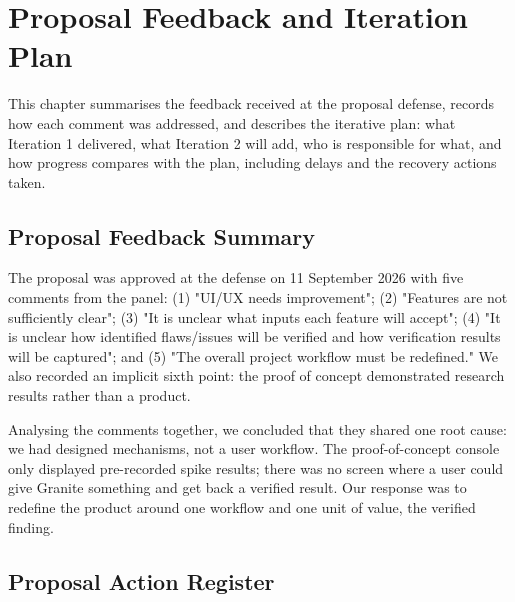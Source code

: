 \documentclass{fast-nuces-bs}
\begin{document}
\chapter{Proposal Feedback and Iteration Plan}

This chapter summarises the feedback received at the proposal defense, records how each comment was addressed, and describes the iterative plan: what Iteration 1 delivered, what Iteration 2 will add, who is responsible for what, and how progress compares with the plan, including delays and the recovery actions taken.

\section{Proposal Feedback Summary}

The proposal was approved at the defense on 11 September 2026 with five comments from the panel: (1) "UI/UX needs improvement"; (2) "Features are not sufficiently clear"; (3) "It is unclear what inputs each feature will accept"; (4) "It is unclear how identified flaws/issues will be verified and how verification results will be captured"; and (5) "The overall project workflow must be redefined." We also recorded an implicit sixth point: the proof of concept demonstrated research results rather than a product.

Analysing the comments together, we concluded that they shared one root cause: we had designed mechanisms, not a user workflow. The proof-of-concept console only displayed pre-recorded spike results; there was no screen where a user could give Granite something and get back a verified result. Our response was to redefine the product around one workflow and one unit of value, the verified finding.

\section{Proposal Action Register}
\end{document}
